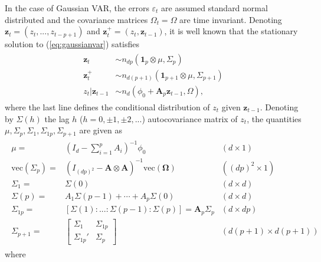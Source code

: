 \documentclass[nojss]{jss}
\begin{document}
In the case of Gaussian VAR, the errors $\varepsilon_t$ are assumed standard normal distributed and the covariance matrices $\Omega_t=\Omega$ are time invariant. Denoting $\boldsymbol{z}_t=(z_t,...,z_{t-p+1})$ and $\boldsymbol{z}_t^{+}=(z_t,\boldsymbol{z}_{t-1})$, it is well known that the stationary solution to (\ref{eq:gaussianvar}) satisfies
\begin{align}\label{eq:gausdist}
\begin{aligned}
\boldsymbol{z}_t & \sim n_{dp}(\boldsymbol{1}_p\otimes\mu,\Sigma_{p}) \\
\boldsymbol{z}^{+}_t & \sim n_{d(p+1)}(\boldsymbol{1}_{p+1}\otimes\mu,\Sigma_{p+1}) \\
z_t|\boldsymbol{z}_{t-1} & \sim n_d(\phi_{0} + \boldsymbol{A}_p\boldsymbol{z}_{t-1}, \Omega),
 \end{aligned}
\end{align}
where the last line defines the conditional distribution of $z_t$ given $\boldsymbol{z}_{t-1}$.  Denoting by $\Sigma(h)$ the lag $h$ ($h=0,\pm 1, \pm 2,...$) autocovariance matrix of $z_t$, the quantities $\mu,\Sigma_p,\Sigma_1,\Sigma_{1p},\Sigma_{p+1}$ are given as \cite[see, e.g.,][pp.  23,  28-29]{Lutkepohl:2005}
\begin{align}\label{eq:gausquantities}
\begin{aligned}
\mu = & (I_d - \sum_{i=1}^pA_i)^{-1}\phi_0 & (d\times 1) \\
\text{vec}(\Sigma_p) = & (I_{(dp)^2} - \boldsymbol{A}\otimes\boldsymbol{A})^{-1}\text{vec}(\boldsymbol{\Omega}) & ((dp)^2\times 1)  \\
\Sigma_1 = & \Sigma(0) %
& (d\times d) \\
\Sigma(p) = & A_1\Sigma(p - 1) + \cdots + A_p\Sigma(0) & (d\times d) \\
\Sigma_{1p} = & [\Sigma(1):...:\Sigma(p-1):\Sigma(p)] = \boldsymbol{A}_p\Sigma_p & (d\times dp) \\
\Sigma_{p+1} = &
\begin{bmatrix}
\Sigma_1       & \Sigma_{1p} \\
\Sigma_{1p}' & \Sigma_p
\end{bmatrix}
& (d(p+1) \times d(p+1))
\end{aligned}
\end{align}
where
\end{document}
